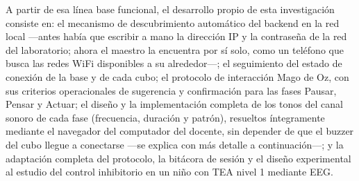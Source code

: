 \documentclass{book}
\begin{document}
A partir de esa línea base funcional, el desarrollo propio de esta investigación consiste en: el mecanismo de descubrimiento automático del backend en la red local —antes había que escribir a mano la dirección IP y la contraseña de la red del laboratorio; ahora el maestro la encuentra por sí solo, como un teléfono que busca las redes WiFi disponibles a su alrededor—; el seguimiento del estado de conexión de la base y de cada cubo; el protocolo de interacción Mago de Oz, con sus criterios operacionales de sugerencia y confirmación para las fases Pausar, Pensar y Actuar; el diseño y la implementación completa de los tonos del canal sonoro de cada fase (frecuencia, duración y patrón), resueltos íntegramente mediante el navegador del computador del docente, sin depender de que el buzzer del cubo llegue a conectarse —se explica con más detalle a continuación—; y la adaptación completa del protocolo, la bitácora de sesión y el diseño experimental al estudio del control inhibitorio en un niño con TEA nivel 1 mediante EEG.
\end{document}
